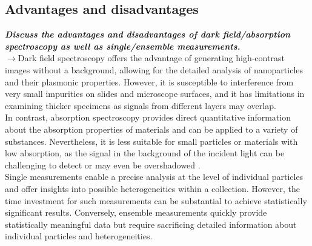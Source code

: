 \subsection{\label{subsec:FZV5}Advantages and disadvantages}
\textbf{\textit{Discuss the advantages and disadvantages of dark field/absorption spectroscopy 
as well as single/ensemble measurements.}} \\
$\rightarrow$Dark field spectroscopy offers the advantage of generating high-contrast images without a 
background, allowing for the detailed analysis of nanoparticles and their plasmonic properties. 
However, it is susceptible to interference from very small impurities on slides and microscope surfaces, 
and it has limitations in examining thicker specimens as signals from different layers may overlap. \\
In contrast, absorption spectroscopy provides direct quantitative information about the absorption properties 
of materials and can be applied to a variety of substances. Nevertheless, it is less suitable for small 
particles or materials with low absorption, as the signal in the background of the incident light can be 
challenging to detect or may even be overshadowed \cite{FZV5}. \\
Single measurements enable a precise analysis at the level of individual particles and offer insights 
into possible heterogeneities within a collection. However, the time investment for such measurements can 
be substantial to achieve statistically significant results. Conversely, ensemble measurements quickly 
provide statistically meaningful data but require sacrificing detailed information about individual 
particles and heterogeneities. \\